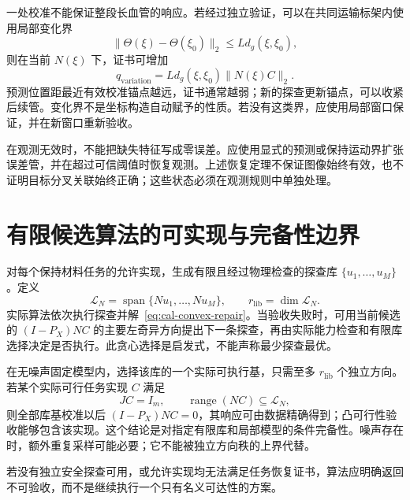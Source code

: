 \documentclass[11pt,a4paper]{article}
\numberwithin{equation}{section}
\theoremstyle{definition}
\begin{document}
一处校准不能保证整段长血管的响应。若经过独立验证，可以在共同运输标架内使用局部变化界
\begin{equation}
  \|\Theta(\xi)-\Theta(\xi_0)\|_2
  \le Ld_g(\xi,\xi_0),
  \label{eq:cal-spatial-variation}
\end{equation}
则在当前 $N(\xi)$ 下，证书可增加
\begin{equation}
  q_{\mathrm{variation}}=
  Ld_g(\xi,\xi_0)\|N(\xi)C\|_2 .
  \label{eq:cal-variation-q}
\end{equation}
预测位置距最近有效校准锚点越远，证书通常越弱；新的探查更新锚点，可以收紧后续管。变化界不是坐标构造自动赋予的性质。若没有这类界，应使用局部窗口保证，并在新窗口重新验收。

在观测无效时，不能把缺失特征写成零误差。应使用显式的预测或保持运动界扩张误差管，并在超过可信阈值时恢复观测。上述恢复定理不保证图像始终有效，也不证明目标分叉关联始终正确；这些状态必须在观测规则中单独处理。

\section{有限候选算法的可实现与完备性边界}
\label{sec:cal-finite}

对每个保持材料任务的允许实现，生成有限且经过物理检查的探查库 $\{u_1,\ldots,u_M\}$。定义
\begin{equation}
  \mathcal L_N=
  \operatorname{span}\{Nu_1,\ldots,Nu_M\},
  \qquad r_{\mathrm{lib}}=\dim\mathcal L_N .
\end{equation}
实际算法依次执行探查并解~\eqref{eq:cal-convex-repair}。当验收失败时，可用当前候选的 $(I-P_X)NC$ 的主要左奇异方向提出下一条探查，再由实际能力检查和有限库选择决定是否执行。此贪心选择是启发式，不能声称最少探查最优。

在无噪声固定模型内，选择该库的一个实际可执行基，只需至多 $r_{\mathrm{lib}}$ 个独立方向。若某个实际可行任务实现 $C$ 满足
\begin{equation}
  JC=I_m,\qquad
  \operatorname{range}(NC)\subseteq\mathcal L_N ,
\end{equation}
则全部库基校准以后 $(I-P_X)NC=0$，其响应可由数据精确得到；凸可行性验收能够包含该实现。这个结论是对指定有限库和局部模型的条件完备性。噪声存在时，额外重复采样可能必要；它不能被独立方向秩的上界代替。

若没有独立安全探查可用，或允许实现均无法满足任务恢复证书，算法应明确返回不可验收，而不是继续执行一个只有名义可达性的方案。
\end{document}
